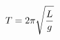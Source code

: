 \documentclass[preview]{standalone}
\begin{document}
\begin{align*}
\special{dvisvgm:raw <g id='unique000'>}T = 2\pi \sqrt{\frac{L}{g}}\special{dvisvgm:raw </g>}
\end{align*}
\end{document}
